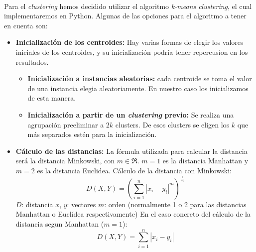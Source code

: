 \documentclass[10pt,a4paper]{article}
\begin{document}
	\paragraph{}
	Para el \textit{clustering} hemos decidido utilizar el algoritmo \textit{k-means clustering}, el cual implementaremos en Python. Algunas de las opciones para el algoritmo a tener en cuenta son:
	\begin{itemize}
		\item \textbf{Inicialización de los centroides:} Hay varias formas de elegir los valores iniciales de los centroides, y su inicialización podría tener repercusíon en los resultados.
		\begin{itemize}
		    \item \textbf{Inicialización a instancias aleatorias: } cada centroide se toma el valor de una instancia elegia aleatoriamente. En nuestro caso los inicializamos de esta manera.
		    \item \textbf{Inicialización a partir de un \textit{clustering} previo:} Se realiza una agrupación preeliminar a $2k$ clusters. De esos clusters se eligen los $k$ que más separados estén para la inicialización.
	    \end{itemize}
		\item \textbf{Cálculo de las distancias:} La fórmula utilizada para calcular la distancia será la distancia Minkowski, con \(m \in \Re\). \(m=1\) es la distancia Manhattan y \(m=2\) es la distancia Euclidea.
		Cálculo de la distancia con Minkowski: \cite{Minkowski} 
		    \begin{equation}
		    	 D(X,Y)=(\sum_{i=1}^n |x_i - y_i|^m)^\frac{1}{m}
			\end{equation}		    
		    $D$: distancia \newline
		    $x$, $y$: vectores  \newline
		    $m$: orden (normalmente 1 o 2 para las distancias Manhattan o Euclídea respectivamente)\newline
		En el caso concreto del cálculo de la distancia segun Manhattan (\(m=1\))\cite{Minkowski}:
		\begin{equation}
		    D(X,Y)=\sum_{i=1}^n |x_i - y_i|
		\end{equation}
		

\end{itemize}
\end{document}

